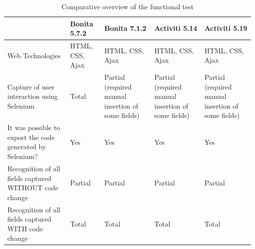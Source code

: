 \documentclass[runningheads,a4paper]{llncs}
\begin{document}

\begin{table}
\centering
\begin{center}
\begin{tabular}{p{3cm}|p{2cm}|p{2.5cm}|p{2.5cm}|p{2.5cm}}
\hline
 & Bonita 5.7.2 & Bonita 7.1.2 & Activiti 5.14 & Activiti 5.19 \\\hline
Web Technologies & HTML, CSS, Ajax & HTML, CSS, Ajax & HTML, CSS, Ajax & HTML, CSS, Ajax \\\hline
Capture of user interaction using Selenium & Total & Partial (required manual insertion of some fields) & Partial (required manual insertion of some fields) & Partial (required manual insertion of some fields) \\\hline
It was possible to export the code generated by Selenium? & Yes & Yes & Yes & Yes\\\hline
Recognition of all fields captured WITHOUT code change & Partial & Partial & Partial & Partial \\\hline
Recognition of all fields captured WITH code change & Total & Total & Total & Total \\\hline
\end{tabular}
\caption{Comparative overview of the functional test}
\label{tab:testeFuncional}
\end{center}
\end{table}
\end{document}
